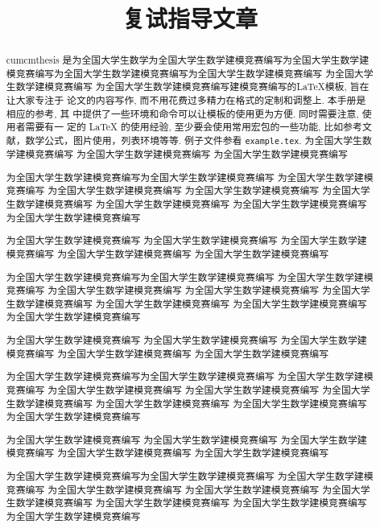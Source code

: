 \documentclass[withoutpreface,bwprint]{cumcmthesis} %
\title{复试指导文章}
\begin{document}
 \maketitle
 \begin{abstract}
cumcmthesis 是为全国大学生数学为全国大学生数学建模竞赛编写为全国大学生数学建模竞赛编写为全国大学生数学建模竞赛编写为全国大学生数学建模竞赛编写
为全国大学生数学建模竞赛编写
为全国大学生数学建模竞赛编写建模竞赛编写的\LaTeX{}模板, 旨在让大家专注于 论文的内容写作, 而不用花费过多精力在格式的定制和调整上. 本手册是相应的参考, 其 中提供了一些环境和命令可以让模板的使用更为方便. 同时需要注意, 使用者需要有一 定的 \LaTeX{} 的使用经验, 至少要会使用常用宏包的一些功能, 比如参考文献，数学公式，图片使用，列表环境等等. 例子文件参看 \texttt{example.tex}.
为全国大学生数学建模竞赛编写
为全国大学生数学建模竞赛编写
为全国大学生数学建模竞赛编写

为全国大学生数学建模竞赛编写为全国大学生数学建模竞赛编写
为全国大学生数学建模竞赛编写
为全国大学生数学建模竞赛编写
为全国大学生数学建模竞赛编写
为全国大学生数学建模竞赛编写
为全国大学生数学建模竞赛编写
为全国大学生数学建模竞赛编写
为全国大学生数学建模竞赛编写

为全国大学生数学建模竞赛编写
为全国大学生数学建模竞赛编写
为全国大学生数学建模竞赛编写
为全国大学生数学建模竞赛编写
为全国大学生数学建模竞赛编写

为全国大学生数学建模竞赛编写为全国大学生数学建模竞赛编写
为全国大学生数学建模竞赛编写
为全国大学生数学建模竞赛编写
为全国大学生数学建模竞赛编写
为全国大学生数学建模竞赛编写
为全国大学生数学建模竞赛编写
为全国大学生数学建模竞赛编写
为全国大学生数学建模竞赛编写

为全国大学生数学建模竞赛编写
为全国大学生数学建模竞赛编写
为全国大学生数学建模竞赛编写
为全国大学生数学建模竞赛编写
为全国大学生数学建模竞赛编写

为全国大学生数学建模竞赛编写为全国大学生数学建模竞赛编写
为全国大学生数学建模竞赛编写
为全国大学生数学建模竞赛编写
为全国大学生数学建模竞赛编写
为全国大学生数学建模竞赛编写
为全国大学生数学建模竞赛编写
为全国大学生数学建模竞赛编写
为全国大学生数学建模竞赛编写

为全国大学生数学建模竞赛编写
为全国大学生数学建模竞赛编写
为全国大学生数学建模竞赛编写
为全国大学生数学建模竞赛编写
为全国大学生数学建模竞赛编写

为全国大学生数学建模竞赛编写为全国大学生数学建模竞赛编写
为全国大学生数学建模竞赛编写
为全国大学生数学建模竞赛编写
为全国大学生数学建模竞赛编写
为全国大学生数学建模竞赛编写
为全国大学生数学建模竞赛编写
为全国大学生数学建模竞赛编写
为全国大学生数学建模竞赛编写


\end{abstract}
\end{document}
